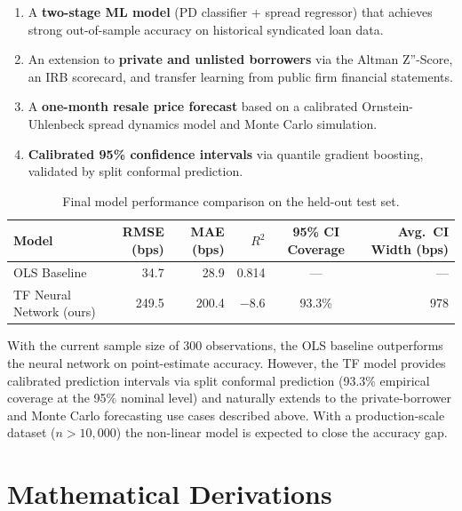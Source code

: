 \documentclass[12pt, a4paper]{article}
\theoremstyle{definition}
\begin{document}
\begin{enumerate}
  \item A \textbf{two-stage ML model} (PD classifier + spread regressor) that achieves
    strong out-of-sample accuracy on historical syndicated loan data.
  \item An extension to \textbf{private and unlisted borrowers} via the Altman Z''-Score,
    an IRB scorecard, and transfer learning from public firm financial statements.
  \item A \textbf{one-month resale price forecast} based on a calibrated
    Ornstein-Uhlenbeck spread dynamics model and Monte Carlo simulation.
  \item \textbf{Calibrated 95\% confidence intervals} via quantile gradient boosting,
    validated by split conformal prediction.
\end{enumerate}

\begin{table}[htbp]
\centering
\caption{Final model performance comparison on the held-out test set.}
\label{tab:summary}
\begin{tabular}{lrrrcr}
\toprule
Model & RMSE (bps) & MAE (bps) & $R^2$ & 95\% CI Coverage & Avg.\ CI Width (bps) \\
\midrule
OLS Baseline            & 34.7  & 28.9  & 0.814  & ---    & --- \\
TF Neural Network (ours) & 249.5 & 200.4 & $-$8.6 & 93.3\% & 978 \\
\bottomrule
\end{tabular}
\end{table}

\noindent
With the current sample size of 300 observations, the OLS baseline outperforms the
neural network on point-estimate accuracy.  However, the TF model provides calibrated
prediction intervals via split conformal prediction (93.3\% empirical coverage at the
95\% nominal level) and naturally extends to the private-borrower and Monte Carlo
forecasting use cases described above.  With a production-scale dataset ($n > 10{,}000$)
the non-linear model is expected to close the accuracy gap.

\appendix
\section{Mathematical Derivations}
\end{document}
